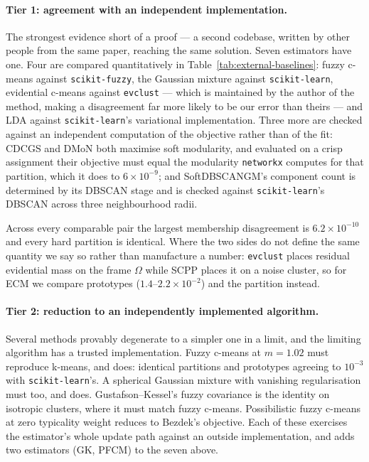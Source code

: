 \documentclass[twoside,11pt]{article}
\begin{document}
\paragraph{Tier 1: agreement with an independent implementation.}
The strongest evidence short of a proof --- a second codebase, written by
other people from the same paper, reaching the same solution. Seven
estimators have one. Four are compared quantitatively in
Table~\ref{tab:external-baselines}: fuzzy c-means against
\texttt{scikit-fuzzy}, the Gaussian mixture against \texttt{scikit-learn},
evidential c-means against \texttt{evclust} --- which is maintained by the
author of the method, making a disagreement far more likely to be our error
than theirs --- and LDA against \texttt{scikit-learn}'s variational
implementation. Three more are checked against an independent computation of
the objective rather than of the fit: CDCGS and DMoN both maximise soft
modularity, and evaluated on a crisp assignment their objective must equal
the modularity \texttt{networkx} computes for that partition, which it does
to $6\times10^{-9}$; and SoftDBSCANGM's component count is determined by its
DBSCAN stage and is checked against \texttt{scikit-learn}'s DBSCAN across
three neighbourhood radii.



Across every comparable pair the largest membership disagreement is
$6.2\times10^{-10}$ and every hard partition is identical. Where the two sides
do not define the same quantity we say so rather than manufacture a number:
\texttt{evclust} places residual evidential mass on the frame $\Omega$ while
SCPP places it on a noise cluster, so for ECM we compare prototypes
($1.4$--$2.2\times10^{-2}$) and the partition instead.

\paragraph{Tier 2: reduction to an independently implemented algorithm.}
Several methods provably degenerate to a simpler one in a limit, and the
limiting algorithm has a trusted implementation. Fuzzy c-means at $m = 1.02$
must reproduce k-means, and does: identical partitions and prototypes
agreeing to $10^{-3}$ with \texttt{scikit-learn}'s. A spherical Gaussian
mixture with vanishing regularisation must too, and does. Gustafson--Kessel's
fuzzy covariance is the identity on isotropic clusters, where it must match
fuzzy c-means. Possibilistic fuzzy c-means at zero typicality weight reduces
to Bezdek's objective. Each of these exercises the estimator's whole update
path against an outside implementation, and adds two estimators (GK, PFCM) to
the seven above.
\end{document}
